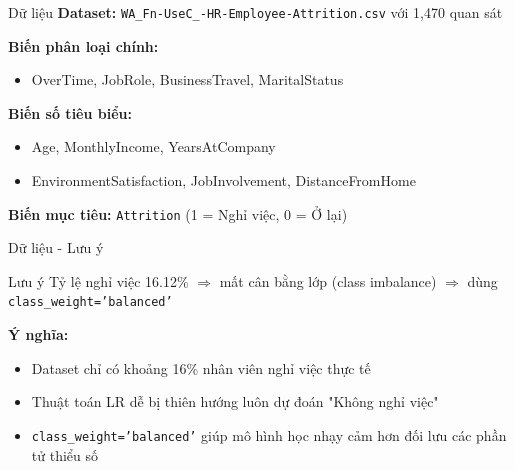 \begin{frame}{Dữ liệu}
  \textbf{Dataset:} \texttt{WA\_Fn-UseC\_-HR-Employee-Attrition.csv} với 1{,}470 quan sát
  
  \vspace{0.4cm}
  \textbf{Biến phân loại chính:}
  \begin{itemize}
    \item OverTime, JobRole, BusinessTravel, MaritalStatus
  \end{itemize}
  
  \vspace{0.4cm}
  \textbf{Biến số tiêu biểu:}
  \begin{itemize}
    \item Age, MonthlyIncome, YearsAtCompany
    \item EnvironmentSatisfaction, JobInvolvement, DistanceFromHome
  \end{itemize}
  
  \vspace{0.4cm}
  \textbf{Biến mục tiêu:} \texttt{Attrition} (1 = Nghỉ việc, 0 = Ở lại)
\end{frame}

\begin{frame}{Dữ liệu - Lưu ý}
  \begin{alertblock}{Lưu ý}
    Tỷ lệ nghỉ việc 16.12\% $\Rightarrow$ mất cân bằng lớp (class imbalance) $\Rightarrow$ dùng \texttt{class\_weight='balanced'}
  \end{alertblock}
  
  \vspace{0.4cm}
  \textbf{Ý nghĩa:}
  \begin{itemize}
    \item Dataset chỉ có khoảng 16\% nhân viên nghỉ việc thực tế
    \item Thuật toán LR dễ bị thiên hướng luôn dự đoán "Không nghỉ việc"
    \item \texttt{class\_weight='balanced'} giúp mô hình học nhạy cảm hơn đối lưu các phần tử thiểu số
  \end{itemize}
\end{frame}


